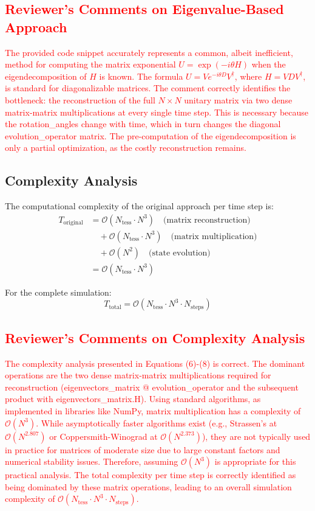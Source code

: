 \documentclass[11pt,a4paper]{article}
\newcommand{\bigO}{\mathcal{O}}
\begin{document}
\textcolor{red}{
\subsection*{Reviewer's Comments on Eigenvalue-Based Approach}
The provided code snippet accurately represents a common, albeit inefficient, method for computing the matrix exponential $U = \exp(-i\theta H)$ when the eigendecomposition of $H$ is known. The formula $U = V e^{-i\theta D} V^\dagger$, where $H = V D V^\dagger$, is standard for diagonalizable matrices. The comment correctly identifies the bottleneck: the reconstruction of the full $N \times N$ unitary matrix via two dense matrix-matrix multiplications at every single time step. This is necessary because the rotation\_angles change with time, which in turn changes the diagonal evolution\_operator matrix. The pre-computation of the eigendecomposition is only a partial optimization, as the costly reconstruction remains.
}

\subsection{Complexity Analysis}

The computational complexity of the original approach per time step is:
\begin{align}
T_{\text{original}} &= \bigO(N_{\text{tess}} \cdot N^3) \quad \text{(matrix reconstruction)}\\
&\quad + \bigO(N_{\text{tess}} \cdot N^3) \quad \text{(matrix multiplication)}\\
&\quad + \bigO(N^2) \quad \text{(state evolution)}\\
&= \bigO(N_{\text{tess}} \cdot N^3)
\end{align}

For the complete simulation:
\begin{equation}
T_{\text{total}} = \bigO(N_{\text{tess}} \cdot N^3 \cdot N_{\text{steps}})
\end{equation}

\textcolor{red}{
\subsection*{Reviewer's Comments on Complexity Analysis}
The complexity analysis presented in Equations (6)-(8) is correct. The dominant operations are the two dense matrix-matrix multiplications required for reconstruction (eigenvectors\_matrix @ evolution\_operator and the subsequent product with eigenvectors\_matrix.H). Using standard algorithms, as implemented in libraries like NumPy, matrix multiplication has a complexity of $\bigO(N^3)$. While asymptotically faster algorithms exist (e.g., Strassen's at $\bigO(N^{2.807})$ or Coppersmith-Winograd at $\bigO(N^{2.373})$), they are not typically used in practice for matrices of moderate size due to large constant factors and numerical stability issues. Therefore, assuming $\bigO(N^3)$ is appropriate for this practical analysis. The total complexity per time step is correctly identified as being dominated by these matrix operations, leading to an overall simulation complexity of $\bigO(N_{\text{tess}} \cdot N^3 \cdot N_{\text{steps}})$.
}
\end{document}
